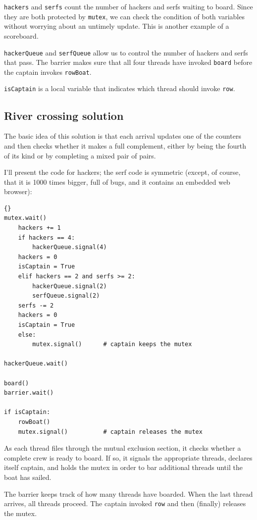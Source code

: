 \documentclass{book}
\newcommand{\clearemptydoublepage}{\newpage\cleardoublepage}
\begin{document}
{\tt hackers} and {\tt serfs} count the number of hackers
and serfs waiting to board.  Since they are both protected by
{\tt mutex}, we can check the condition of both variables without
worrying about an untimely update.  This is another example
of a scoreboard.

{\tt hackerQueue} and {\tt serfQueue} allow us to control the number
of hackers and serfs that pass.  The barrier
makes sure that all four threads have invoked
{\tt board} before the captain invokes {\tt rowBoat}.

{\tt isCaptain} is a local variable that
indicates which thread should invoke {\tt row}.

\clearemptydoublepage
\subsection {River crossing solution}

The basic idea of this solution is that each arrival updates
one of the counters and then checks whether it makes a
full complement, either by being the fourth of its kind or
by completing a mixed pair of pairs.

I'll present the code for hackers; the serf code is
symmetric (except, of course, that it is 1000 times bigger,
full of bugs, and it contains an embedded web browser):

\begin{lstlisting}[title={River crossing solution}]{}
mutex.wait()
    hackers += 1
    if hackers == 4:
        hackerQueue.signal(4)                
	hackers = 0
	isCaptain = True
    elif hackers == 2 and serfs >= 2:
        hackerQueue.signal(2)                
        serfQueue.signal(2)                  
	serfs -= 2
	hackers = 0
	isCaptain = True
    else:
        mutex.signal()      # captain keeps the mutex

hackerQueue.wait()           

board()
barrier.wait()            

if isCaptain:
    rowBoat()
    mutex.signal()          # captain releases the mutex
\end{lstlisting}

As each thread files through the mutual exclusion section, it
checks whether a complete crew is ready to board.  If so, it
signals the appropriate threads, declares itself captain, and
holds the mutex in order to bar additional threads until the
boat has sailed.

The barrier keeps track of how many threads have boarded.
When the last thread arrives, all threads proceed.
The captain invoked {\tt row} and then (finally) releases the mutex.
\end{document}
